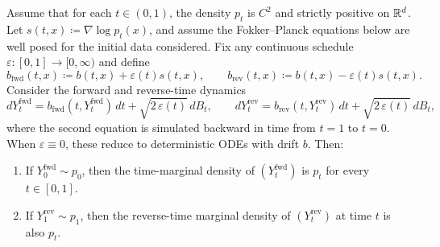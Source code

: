 \begin{proposition}
\label{prop:si-family-of-sdes}
Assume that for each \(t\in(0,1)\), the density \(p_t\) is \(C^2\) and strictly positive on \(\mathbb{R}^d\).
Let \(s(t,x)\coloneqq\nabla\log p_t(x)\), and assume the Fokker--Planck equations below are well posed for the initial data considered.
Fix any continuous schedule \(\varepsilon:[0,1]\to[0,\infty)\) and define
\begin{equation}
  b_{\mathrm{fwd}}(t,x) \coloneqq b(t,x) + \varepsilon(t)s(t,x),
  \qquad
  b_{\mathrm{rev}}(t,x) \coloneqq b(t,x) - \varepsilon(t)s(t,x).
  \label{eq:si-forward-backward-drifts}
\end{equation}
Consider the forward and reverse-time dynamics
\begin{equation}
  dY_t^{\mathrm{fwd}}=b_{\mathrm{fwd}}(t,Y_t^{\mathrm{fwd}})\,dt+\sqrt{2\,\varepsilon(t)}\,dB_t,
  \qquad
  dY_t^{\mathrm{rev}}=b_{\mathrm{rev}}(t,Y_t^{\mathrm{rev}})\,dt+\sqrt{2\,\varepsilon(t)}\,dB_t,
  \label{eq:si-forward-backward-sdes}
\end{equation}
where the second equation is simulated backward in time from \(t=1\) to \(t=0\).
When \(\varepsilon\equiv 0\), these reduce to deterministic ODEs with drift \(b\).
Then:
\begin{enumerate}[leftmargin=*]
  \item If \(Y_0^{\mathrm{fwd}}\sim p_0\), then the time-marginal density of \((Y_t^{\mathrm{fwd}})\) is \(p_t\) for every \(t\in[0,1]\).
  \item If \(Y_1^{\mathrm{rev}}\sim p_1\), then the reverse-time marginal density of \((Y_t^{\mathrm{rev}})\) at time \(t\) is also \(p_t\).
\end{enumerate}
\end{proposition}
